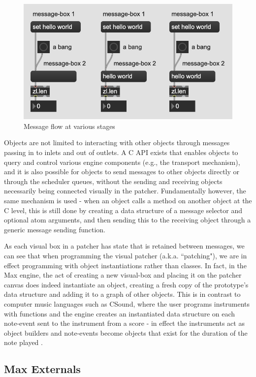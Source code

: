 \documentclass[acmsmall]{acmart}
\begin{document}
\begin{figure}[H]
  \centering
  \includegraphics[width=.5\linewidth]{fig-2}
  \caption{Message flow at various stages}
\end{figure}

Objects are not limited to interacting with other objects through messages passing in to inlets and out of 
outlets. A C API exists that enables objects to query and control various engine components (e.g., 
the transport mechanism), and it is also possible for objects to send messages to other objects 
directly or through the scheduler queues, without the sending and receiving objects 
necessarily being connected visually in the patcher. Fundamentally however, the same mechanism
is used - when an object calls a method on another object at the C level, this is still done
by creating a data structure of a message selector and optional atom arguments, 
and then sending this to the receiving object through a generic message sending function.

As each visual box in a patcher has state that is retained between messages, we can see that when
programming the visual patcher (a.k.a. ``patching"), we are in effect programming with
object instantiations rather than classes. In fact, in the Max engine, the act of creating
a new visual-box and placing it on the patcher canvas does indeed instantiate an object, creating
a fresh copy of the prototype's data structure and adding it to a graph of other objects.
This is in contrast to computer music languages such as CSound, where the user programs instruments 
with functions and the engine creates an instantiated data structure on each note-event sent to 
the instrument from a score - in effect the instruments act as object builders and note-events 
become objects that exist for the duration of the note played \cite{Lazzarini2013}.

\subsection{Max Externals}
\end{document}
